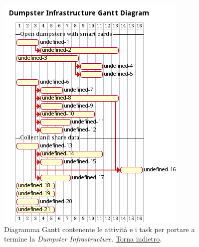 \begin{figure}[H]
    \centering
    \includegraphics[width=\textwidth]{uml/gantt-dumpster-infrastructure.pm}
    \caption{Diagramma Gantt contenente le attività e i task per portare a termine la \textit{Dumpster Infrastructure}. \hyperlink{back:uml/gantt-dumpster-infrastructure}{Torna indietro}.}
    \label{fig:uml/gantt-dumpster-infrastructure}
\end{figure}


